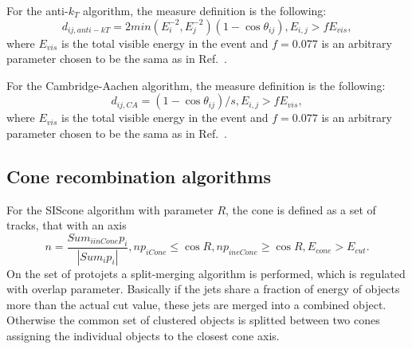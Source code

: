 For the anti-$k_{T}$ algorithm, the measure definition is the following:
$$
d_{ij,anti-kT}=2min(E_i^{-2},E_j^{-2})(1-\cos{\theta_{ij}}), E_{i,j}>fE_{vis},
$$
where $E_{vis}$ is the total visible energy in the event
and $f=0.077$ is an arbitrary parameter chosen to be the sama as in Ref.~\cite{Catani:1991hj}.


For the Cambridge-Aachen algorithm, the measure definition is the following:
$$
d_{ij,CA}=(1-\cos{\theta_{ij}})/s, E_{i,j}>fE_{vis},
$$
where $E_{vis}$ is the total visible energy in the event
and $f=0.077$ is an arbitrary parameter chosen to be the sama as in Ref.~\cite{Catani:1991hj}.
\subsection{Cone recombination algorithms}
\label{sec:algorithmscone}

For the SIScone algorithm with parameter $R$, the cone is defined as a set of tracks, that
with an axis 
$$
n=\frac{Sum_{i in Cone}p_i}{|Sum_{i}p_i|}, np_{i Cone} \le \cos{R}, np_{i ne Cone}\ge \cos{R}, E_{cone}>E_{cut}.
$$
On the set of protojets a split-merging algorithm is performed, which is regulated with
overlap parameter. Basically if the jets share a fraction of energy of objects more than the actual cut value,
these jets are merged into a combined object. Otherwise the common set of clustered objects is splitted between
two cones assigning the individual objects to the closest cone axis.


